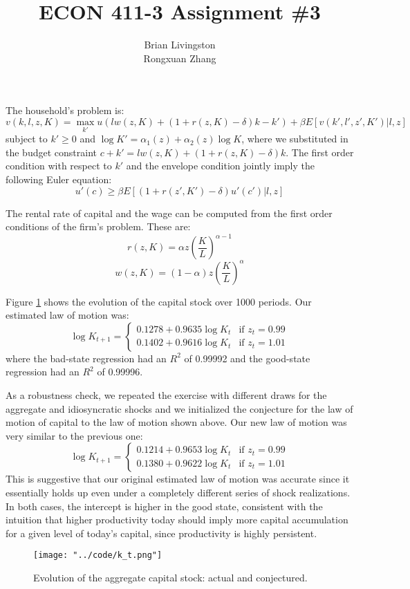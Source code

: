 \documentclass{article}
\title{ECON 411-3 Assignment \#3}
\author{Brian Livingston \\ Rongxuan Zhang}
\date{}
\begin{document}
\maketitle

The household's problem is:
$$
v(k,l,z,K) = \max_{k'} u(lw(z,K)+(1+r(z,K)-\delta)k-k')+\beta E[v(k',l',z',K')|l,z]
$$
subject to $k'\geq 0$ and $\log K'=\alpha_1(z)+\alpha_2(z) \log K$, where we substituted in the budget constraint $c+k'=lw(z,K)+(1+r(z,K)-\delta)k$.
The first order condition with respect to $k'$ and the envelope condition jointly imply the following Euler equation:
$$
u'(c) \geq \beta E[(1+r(z',K')-\delta)u'(c')|l,z]
$$

The rental rate of capital and the wage can be computed from the first order conditions of the firm's problem. These are:
$$
r(z,K) = \alpha z\left(\frac{K}{L}\right)^{\alpha-1}
$$
$$
w(z,K) = (1-\alpha)z\left(\frac{K}{L}\right)^{\alpha}
$$

Figure \ref{capstock} shows the evolution of the capital stock over 1000 periods. Our estimated law of motion was:
$$
\log K_{t+1} = \begin{cases}
0.1278 + 0.9635 \log K_t & \text{if } z_t = 0.99 \\
0.1402 + 0.9616 \log K_t & \text{if } z_t = 1.01
\end{cases}
$$
where the bad-state regression had an $R^2$ of 0.99992 and the good-state regression had an $R^2$ of 0.99996.

As a robustness check, we repeated the exercise with different draws for the aggregate and idiosyncratic shocks and we initialized the conjecture for the law of motion of capital to the law of motion shown above.
Our new law of motion was very similar to the previous one:
$$
\log K_{t+1} = \begin{cases}
0.1214 + 0.9653 \log K_t & \text{if } z_t = 0.99 \\
0.1380 + 0.9622 \log K_t & \text{if } z_t = 1.01
\end{cases}
$$
This is suggestive that our original estimated law of motion was accurate since it essentially holds up even under a completely different series of shock realizations.
In both cases, the intercept is higher in the good state, consistent with the intuition that higher productivity today should imply more capital accumulation for a given level of today's capital, since productivity is highly persistent.

\begin{figure}
\centering
\texttt{[image: "../code/k\_t.png"]}
\caption{Evolution of the aggregate capital stock: actual and conjectured.}
\label{capstock}
\end{figure}
\end{document}
